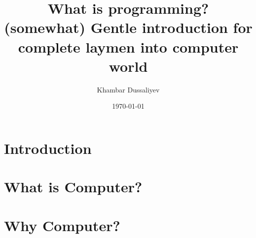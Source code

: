 \documentclass{report}
\title{
    What is programming? \\
    \large (somewhat) Gentle introduction for complete laymen into computer world
}
\author{Khambar Dussaliyev}
\date{\today}
\begin{document}
    \maketitle
    

    \newpage

    \tableofcontents

    \chapter{Introduction}\label{chapter:introduction}

        
        \newpage

    \chapter{What is Computer?}\label{chapter:what-is-computer}

        
        \newpage

    \chapter{Why Computer?}\label{chapter:why-computer}
        
        \newpage
\end{document}
